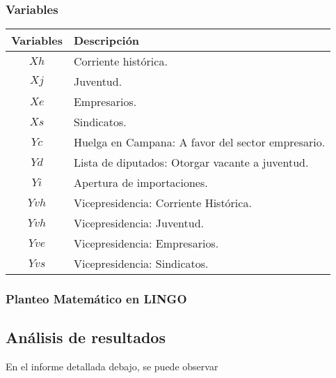 \documentclass[10pt, a4paper, titlepage,
	oneside,
	fleqn, leqno]{article}
\begin{document}
\subsubsection{Variables}

\begin{table}[h!t]
  \centering
  \begin{tabular}{ | c | p{7cm} | }
    \hline
    \textbf{Variables} & \textbf{Descripción} \\ \hline
     \(Xh\)          &  Corriente histórica. \\ \hline
     \(Xj\)          & Juventud. \\ \hline
     \(Xe\)          & Empresarios. \\ \hline
     \(Xs\)          & Sindicatos. \\ \hline
     \(Yc\)          & Huelga en Campana: A favor del sector empresario. \\ \hline
     \(Yd\)          & Lista de diputados: Otorgar vacante a juventud. \\ \hline
     \(Yi\)          & Apertura de importaciones. \\ \hline
     \(Yvh\)          & Vicepresidencia: Corriente Histórica. \\ \hline
     \(Yvh\)          & Vicepresidencia: Juventud. \\ \hline
     \(Yve\)          & Vicepresidencia: Empresarios. \\ \hline
     \(Yvs\)          & Vicepresidencia: Sindicatos. \\ \hline
  \end{tabular}

\end{table}

\subsubsection{Planteo Matemático en LINGO}


\subsection{Análisis de resultados}
En el informe detallada debajo, se puede observar
\end{document}
